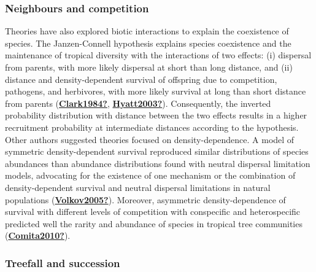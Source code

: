 \documentclass[12pt,twoside,a4paper, a]{article}
\begin{document}
\hypertarget{neighbours-and-competition}{%
\subsubsection{Neighbours and competition}\label{neighbours-and-competition}}

Theories have also explored biotic interactions to explain the coexistence of species.
The Janzen-Connell hypothesis explains species coexistence and the maintenance of tropical diversity with the interactions of two effects:
(i) dispersal from parents, with more likely dispersal at short than long distance,
and (ii) distance and density-dependent survival of offspring due to competition, pathogens, and herbivores,
with more likely survival at long than short distance from parents (\protect\hyperlink{ref-Clark1984}{\textbf{Clark1984?}}, \protect\hyperlink{ref-Hyatt2003}{\textbf{Hyatt2003?}}).
Consequently, the inverted probability distribution with distance between the two effects results in a higher recruitment probability at intermediate distances according to the hypothesis.
Other authors suggested theories focused on density-dependence.
A model of symmetric density-dependent survival reproduced similar distributions of species abundances than abundance distributions found with neutral dispersal limitation models,
advocating for the existence of one mechanism or the combination of density-dependent survival and neutral dispersal limitations in natural populations (\protect\hyperlink{ref-Volkov2005}{\textbf{Volkov2005?}}).
Moreover, asymmetric density-dependence of survival with different levels of competition with conspecific and heterospecific predicted well the rarity and abundance of species in tropical tree communities (\protect\hyperlink{ref-Comita2010}{\textbf{Comita2010?}}).

\hypertarget{treefall-and-succession}{%
\subsubsection{Treefall and succession}\label{treefall-and-succession}}
\end{document}
